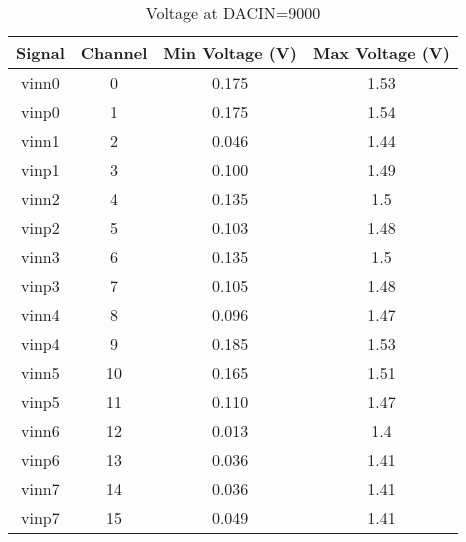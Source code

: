 \begin{table}[h!]
	\centering
	\caption{Voltage at DACIN=9000}
	\begin{tabular}{ |c|c|c|c| }
		\hline
		\textbf{Signal} & \textbf{Channel} & \textbf{Min Voltage (V)} & \textbf{Max Voltage (V)} \\
		\hline
		vinn0           & 0                & 0.175                    & 1.53                     \\
		\hline
		vinp0           & 1                & 0.175                    & 1.54                     \\
		\hline
		vinn1           & 2                & 0.046                    & 1.44                     \\
		\hline
		vinp1           & 3                & 0.100                    & 1.49                     \\
		\hline
		vinn2           & 4                & 0.135                    & 1.5                      \\
		\hline
		vinp2           & 5                & 0.103                    & 1.48                     \\
		\hline
		vinn3           & 6                & 0.135                    & 1.5                      \\
		\hline
		vinp3           & 7                & 0.105                    & 1.48                     \\
		\hline
		vinn4           & 8                & 0.096                    & 1.47                     \\
		\hline
		vinp4           & 9                & 0.185                    & 1.53                     \\
		\hline
		vinn5           & 10               & 0.165                    & 1.51                     \\
		\hline
		vinp5           & 11               & 0.110                    & 1.47                     \\
		\hline
		vinn6           & 12               & 0.013                    & 1.4                      \\
		\hline
		vinp6           & 13               & 0.036                    & 1.41                     \\
		\hline
		vinn7           & 14               & 0.036                    & 1.41                     \\
		\hline
		vinp7           & 15               & 0.049                    & 1.41                     \\
		\hline
	\end{tabular}
\end{table}

